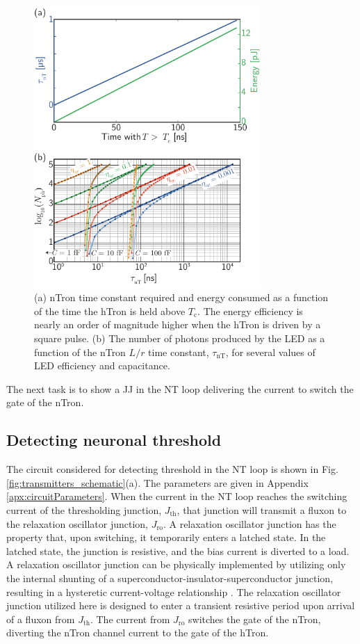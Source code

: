 \documentclass[aip,amsmath,amssymb,reprint,nofootinbib]{revtex4-1}
\begin{document}
\begin{figure}[t!]
	\centerline{\includegraphics[width=8.6cm]{_transmitters_hTron_data_2_small.pdf}}
	\caption{\label{fig:transmitters_hTron_data_2}(a) nTron time constant required and energy consumed as a function of the time the hTron is held above $T_{\mathrm{c}}$. The energy efficiency is nearly an order of magnitude higher when the hTron is driven by a square pulse. (b) The number of photons produced by the LED as a function of the nTron $L/r$ time constant, $\tau_{\mathrm{nT}}$, for several values of LED efficiency and capacitance.}
\end{figure}
The next task is to show a JJ in the NT loop delivering the current to switch the gate of the nTron.
	
\subsection{\label{sec:detectingThreshold}Detecting neuronal threshold}
The circuit considered for detecting threshold in the NT loop is shown in Fig.\,\ref{fig:transmitters_schematic}(a). The parameters are given in Appendix \ref{apx:circuitParameters}. When the current in the NT loop reaches the switching current of the thresholding junction, $J_{\mathrm{th}}$, that junction will transmit a fluxon to the relaxation oscillator junction, $J_{\mathrm{ro}}$. A relaxation oscillator junction has the property that, upon switching, it temporarily enters a latched state. In the latched state, the junction is resistive, and the bias current is diverted to a load. A relaxation oscillator junction can be physically implemented by utilizing only the internal shunting of a superconductor-insulator-superconductor junction, resulting in a hysteretic current-voltage relationship \cite{vatu1998}. The relaxation oscillator junction utilized here is designed to enter a transient resistive period upon arrival of a fluxon from $J_{\mathrm{th}}$. The current from $J_{\mathrm{ro}}$ switches the gate of the nTron, diverting the nTron channel current to the gate of the hTron. 
\end{document}
